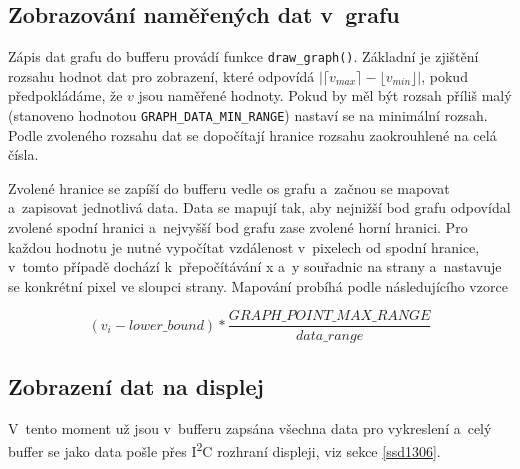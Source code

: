 \documentclass[a4paper, 12pt]{article}
\newcommand{\iic}{I\textsuperscript{2}C }
\begin{document}
    \subsection{Zobrazování naměřených dat v~grafu}
    Zápis dat grafu do bufferu provádí funkce \texttt{draw\_graph()}. Základní je zjištění rozsahu hodnot dat pro zobrazení, které odpovídá $|\lceil v_{max}\rceil - \lfloor v_{min} \rfloor|$, pokud předpokládáme, že $v$ jsou naměřené hodnoty. Pokud by měl být rozsah příliš malý (stanoveno hodnotou \texttt{GRAPH\_DATA\_MIN\_RANGE}) nastaví se na minimální rozsah. Podle zvoleného rozsahu dat se dopočítají hranice rozsahu zaokrouhlené na celá čísla.

    Zvolené hranice se zapíší do bufferu vedle os grafu a~začnou se mapovat a~zapisovat jednotlivá data. Data se mapují tak, aby nejnižší bod grafu odpovídal zvolené spodní hranici a~nejvyšší bod grafu zase zvolené horní hranici. Pro každou hodnotu je nutné vypočítat vzdálenost v~pixelech od spodní hranice, v~tomto případě dochází k~přepočítávání x a~y souřadnic na strany a~nastavuje se konkrétní pixel ve sloupci strany. Mapování probíhá podle následujícího vzorce

    $$ (v_i - lower\_bound) * \frac{GRAPH\_POINT\_MAX\_RANGE}{data\_range}$$

    \subsection{Zobrazení dat na displej}
    V~tento moment už jsou v~bufferu zapsána všechna data pro vykreslení a~celý buffer se jako data pošle přes \iic rozhraní displeji, viz sekce \ref{ssd1306}.
\end{document}
